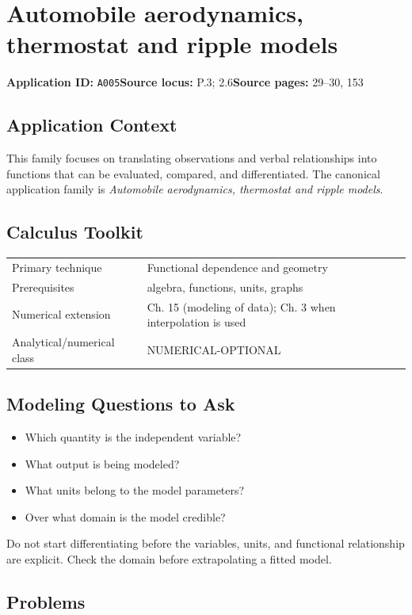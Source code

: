 \documentclass[11pt]{book}
\newcommand{\pid}[1]{\texttt{#1}}
\begin{document}
\chapter{Automobile aerodynamics, thermostat and ripple models}\label{app:A005}
\textbf{Application ID:} \pid{A005}\quad \textbf{Source locus:} P.3; 2.6\quad \textbf{Source pages:} 29–30, 153
\section*{Application Context}
This family focuses on translating observations and verbal relationships into functions that can be evaluated, compared, and differentiated. The canonical application family is \emph{Automobile aerodynamics, thermostat and ripple models}.
\section*{Calculus Toolkit}
\begin{tabularx}{\textwidth}{@{}lX@{}}\toprule
Primary technique & Functional dependence and geometry \\
Prerequisites & algebra, functions, units, graphs \\
Numerical extension & Ch. 15 (modeling of data); Ch. 3 when interpolation is used \\
Analytical/numerical class & NUMERICAL-OPTIONAL \\
\bottomrule\end{tabularx}
\section*{Modeling Questions to Ask}\begin{itemize}
\item Which quantity is the independent variable?
\item What output is being modeled?
\item What units belong to the model parameters?
\item Over what domain is the model credible?
\end{itemize}
\begin{errorbox}Do not start differentiating before the variables, units, and functional relationship are explicit. Check the domain before extrapolating a fitted model.\end{errorbox}
\section*{Problems}
\end{document}
